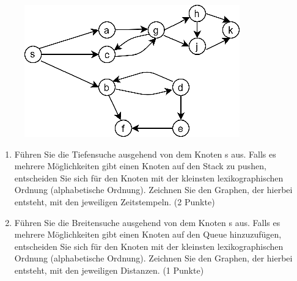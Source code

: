 \documentclass[ngerman,landscape,twocolumn]{adtexsheet}
\begin{document}
\begin{question}
    \begin{figure}
        \centering
        \includegraphics[width=.5\linewidth]{images/ex6q1.png}
        \label{fig:my_label}
    \end{figure}
    \begin{enumerate}
        \item Führen Sie die Tiefensuche ausgehend von dem Knoten s aus. Falls es mehrere Möglichkeiten gibt einen Knoten auf den Stack zu pushen, entscheiden Sie sich für den Knoten mit der kleinsten lexikographischen Ordnung (alphabetische Ordnung). Zeichnen Sie den Graphen, der hierbei entsteht, mit den jeweiligen Zeitstempeln. (2 Punkte)
        
       
        \item Führen Sie die Breitensuche ausgehend von dem Knoten s aus. Falls es mehrere Möglichkeiten gibt einen Knoten auf den Queue hinzuzufügen, entscheiden Sie sich für den Knoten mit der kleinsten lexikographischen Ordnung (alphabetische Ordnung). Zeichnen Sie den Graphen, der hierbei entsteht, mit den jeweiligen Distanzen. (1 Punkte)
        
    \end{enumerate}
\end{question}
\end{document}

